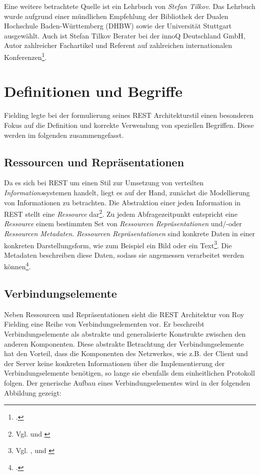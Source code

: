 Eine weitere betrachtete Quelle ist ein Lehrbuch von \emph{Stefan Tilkov}. Das Lehrbuch wurde aufgrund einer mündlichen Empfehlung der Bibliothek der Dualen Hochschule Baden-Württemberg (DHBW) sowie der Universität Stuttgart ausgewählt. Auch ist Stefan Tilkov Berater bei der innoQ Deutschland GmbH, Autor zahlreicher Fachartikel und Referent auf zahlreichen internationalen Konferenzen\footcite[Vgl. ][]{tilkov_stefan_2021}. 

\section{Definitionen und Begriffe}\label{subsection:definitionen-und-begriffe}

Fielding legte bei der formulierung seines REST Architekturstil einen besonderen Fokus auf die Definition und korrekte Verwendung von speziellen Begriffen. Diese werden im folgenden zusammengefasst.

\subsection{Ressourcen und Repräsentationen}\label{subsection:ressourcen-und-repraesentationen}

Da es sich bei REST um einen Stil zur Umsetzung von verteilten \emph{Informations}systemen handelt, liegt es auf der Hand, zunächst die Modellierung von Informationen zu betrachten. Die Abstraktion einer jeden Information in REST stellt eine \emph{Ressource} dar\footnote{Vgl. \cite[S. 30]{richardson_restful_2013} und \cite[S. 81]{richardson_restful_2007}}. Zu jedem Abfragezeitpunkt entspricht eine \emph{Ressource} einem bestimmten Set von \emph{Ressourcen Repräsentationen} und/-oder \emph{Ressourcen Metadaten}. \emph{Ressourcen Repräsentationen} sind konkrete Daten in einer konkreten Darstellungsform, wie zum Beispiel ein Bild oder ein Text\footnote{Vgl. \cite[Vgl. ][S. 88ff]{fielding_architectural_2000}, \cite[][S. 91]{richardson_restful_2007} und \cite[][S. 30]{richardson_restful_2013}}. Die Metadaten beschreiben diese Daten, sodass sie angemessen verarbeitet werden können\footcite[Vgl. ][S. 87]{fielding_architectural_2000}.

\subsection{Verbindungselemente}\label{subsection:verbindungselemente}

Neben Ressourcen und Repräsentationen sieht die REST Architektur von Roy Fielding eine Reihe von Verbindungselementen vor. Er beschreibt Verbindungselemente als abstrakte und generalisierte Konstrukte zwischen den anderen Komponenten. Diese abstrakte Betrachtung der Verbindungselemente hat den Vorteil, dass die Komponenten des Netzwerkes, wie z.B. der Client und der Server keine konkreten Informationen über die Implementierung der Verbindungselemente benötigen, so lange sie ebenfalls dem einheitlichen Protokoll folgen. Der generische Aufbau eines Verbindungselementes wird in der folgenden Abbildung gezeigt:

